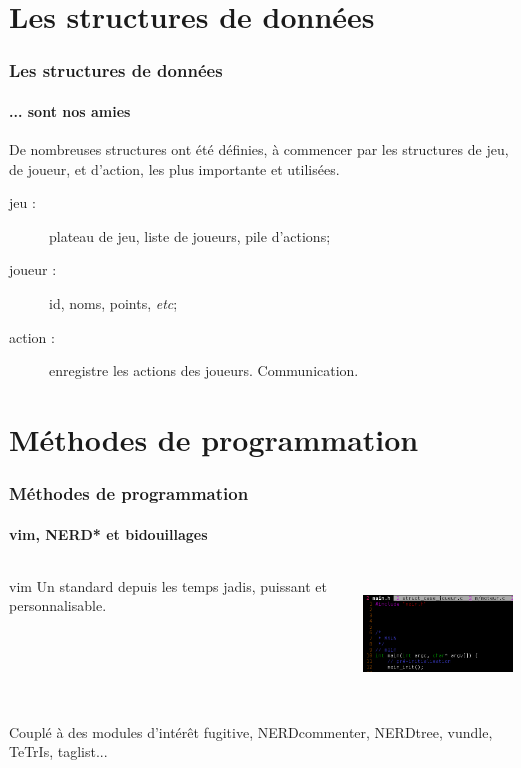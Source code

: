 \documentclass{beamer}
\begin{document}
    \section{Les structures de données}
    \begin{frame}
    \frametitle{Les structures de données}
    \framesubtitle{... sont nos amies}
        De nombreuses structures ont été définies, à commencer 
            par les structures de jeu, de joueur, et d'action, 
            les plus importante et utilisées.\\
        \begin{description}
            \item[jeu :] plateau de jeu, liste de joueurs, pile d'actions;\\
            \item[joueur :] id, noms, points, \textit{etc};\\
            \item[action :] enregistre les actions des joueurs. Communication.\\
        \end{description}
    \end{frame}






    \section{Méthodes de programmation}
    \begin{frame}
    \frametitle{Méthodes de programmation}
    \framesubtitle{vim, NERD* et bidouillages}
        \begin{columns}[c] %
            \begin{column}{6cm} %
                \begin{block}{vim}
                    Un standard depuis les temps jadis, puissant et personnalisable.
                \end{block}
            \end{column}
            \begin{column}{5cm} %
                \includegraphics[width=5cm, height=3cm]{ressources/presentation/vim.png}
            \end{column}
        \end{columns}
        \vspace{1cm} %
        \begin{exampleblock}{Couplé à des modules d'intérêt}
            fugitive, NERDcommenter, NERDtree, vundle, TeTrIs, taglist... 
        \end{exampleblock}
    \end{frame}
\end{document}
